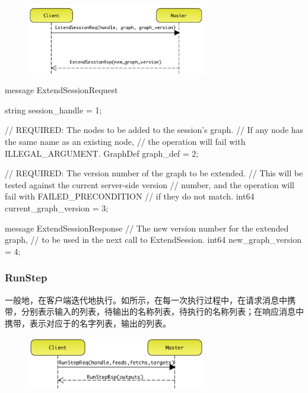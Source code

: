 \begin{content}
\begin{content}
\begin{figure}[H]
\centering
\includegraphics[width=0.7\textwidth]{figures/dist-ms-extend-sess-req.png}
\caption{}
 \label{fig:dist-ms-extend-sess-req}
\end{figure}

\begin{leftbar}
\begin{c++}
message ExtendSessionRequest {
  string session_handle = 1;

  // REQUIRED: The nodes to be added to the session's graph. 
  // If any node has the same name as an existing node, 
  // the operation will fail with ILLEGAL\_ARGUMENT.
  GraphDef graph_def = 2;

  // REQUIRED: The version number of the graph to be extended. 
  // This will be tested against the current server-side version 
  // number, and the operation will fail with FAILED\_PRECONDITION 
  // if they do not match.
  int64 current_graph_version = 3;
}

message ExtendSessionResponse {
  // The new version number for the extended graph, 
  // to be used in the next call to ExtendSession.
  int64 new_graph_version = 4;
}
\end{c++}
\end{leftbar}

\subsubsection{RunStep}

一般地，在客户端迭代地执行。如所示，在每一次执行过程中，在请求消息中携带，分别表示输入的列表，待输出的名称列表，待执行的名称列表；在响应消息中携带，表示对应于的名字列表，输出的列表。

\begin{figure}[H]
\centering
\includegraphics[width=0.7\textwidth]{figures/dist-ms-run-step-req.png}
\caption{}
 \label{fig:dist-ms-run-step-req}
\end{figure}


\end{content}
\end{content}
